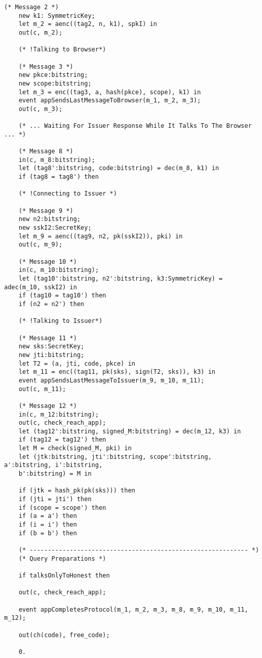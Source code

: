 \begin{Verbatim}[fontsize=\small]
    (* Message 2 *)
    new k1: SymmetricKey;
    let m_2 = aenc((tag2, n, k1), spkI) in
    out(c, m_2);

    (* !Talking to Browser*)

    (* Message 3 *)
    new pkce:bitstring;
    new scope:bitstring;
    let m_3 = enc((tag3, a, hash(pkce), scope), k1) in
    event appSendsLastMessageToBrowser(m_1, m_2, m_3);
    out(c, m_3);

    (* ... Waiting For Issuer Response While It Talks To The Browser ... *)

    (* Message 8 *)
    in(c, m_8:bitstring);
    let (tag8':bitstring, code:bitstring) = dec(m_8, k1) in
    if (tag8 = tag8') then

    (* !Connecting to Issuer *)
 
    (* Message 9 *)
    new n2:bitstring;
    new sskI2:SecretKey;
    let m_9 = aenc((tag9, n2, pk(sskI2)), pki) in
    out(c, m_9);

    (* Message 10 *)
    in(c, m_10:bitstring);
    let (tag10':bitstring, n2':bitstring, k3:SymmetricKey) = adec(m_10, sskI2) in
    if (tag10 = tag10') then
    if (n2 = n2') then

    (* !Talking to Issuer*)

    (* Message 11 *)
    new sks:SecretKey;
    new jti:bitstring;
    let T2 = (a, jti, code, pkce) in
    let m_11 = enc((tag11, pk(sks), sign(T2, sks)), k3) in
    event appSendsLastMessageToIssuer(m_9, m_10, m_11);
    out(c, m_11);

    (* Message 12 *)
    in(c, m_12:bitstring);
    out(c, check_reach_app);
    let (tag12':bitstring, signed_M:bitstring) = dec(m_12, k3) in
    if (tag12 = tag12') then
    let M = check(signed_M, pki) in
    let (jtk:bitstring, jti':bitstring, scope':bitstring, a':bitstring, i':bitstring,
    b':bitstring) = M in

    if (jtk = hash_pk(pk(sks))) then
    if (jti = jti') then
    if (scope = scope') then
    if (a = a') then
    if (i = i') then
    if (b = b') then

    (* ------------------------------------------------------------ *)
    (* Query Preparations *)

    if talksOnlyToHonest then

    out(c, check_reach_app);

    event appCompletesProtocol(m_1, m_2, m_3, m_8, m_9, m_10, m_11, m_12);

    out(ch(code), free_code);

    0.


\end{Verbatim}
